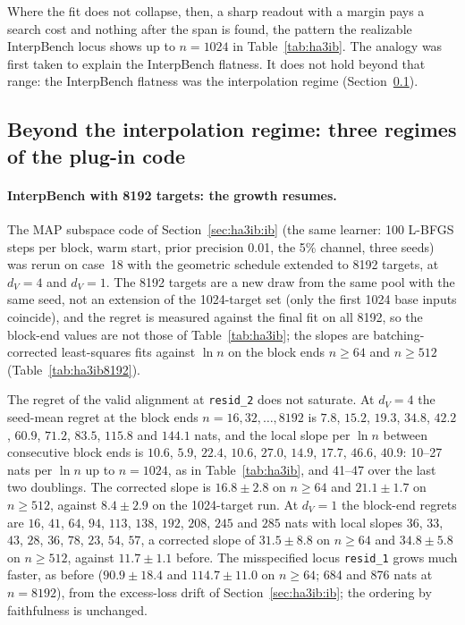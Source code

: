 \documentclass[11pt,a4paper]{article}
\newcommand{\dv}{d_V}
\begin{document}
Where the fit does not collapse, then, a sharp readout with a margin pays a search cost and nothing after the span is found, the pattern the realizable InterpBench locus shows up to $n=1024$ in Table~\ref{tab:ha3ib}. The analogy was first taken to explain the InterpBench flatness. It does not hold beyond that range: the InterpBench flatness was the interpolation regime (Section~\ref{sec:ha3concl}).

\subsection{Beyond the interpolation regime: three regimes of the plug-in code}
\label{sec:ha3concl}

\paragraph{InterpBench with 8192 targets: the growth resumes.} The MAP subspace code of Section~\ref{sec:ha3ib:ib} (the same learner: 100 L-BFGS steps per block, warm start, prior precision 0.01, the 5\% channel, three seeds) was rerun on case~18 with the geometric schedule extended to 8192 targets, at $\dv=4$ and $\dv=1$. The 8192 targets are a new draw from the same pool with the same seed, not an extension of the 1024-target set (only the first 1024 base inputs coincide), and the regret is measured against the final fit on all 8192, so the block-end values are not those of Table~\ref{tab:ha3ib}; the slopes are batching-corrected least-squares fits against $\ln n$ on the block ends $n\ge64$ and $n\ge512$ (Table~\ref{tab:ha3ib8192}).

The regret of the valid alignment at \texttt{resid\_2} does not saturate. At $\dv=4$ the seed-mean regret at the block ends $n=16,32,\dots,8192$ is $7.8$, $15.2$, $19.3$, $34.8$, $42.2$, $60.9$, $71.2$, $83.5$, $115.8$ and $144.1$ nats, and the local slope per $\ln n$ between consecutive block ends is $10.6$, $5.9$, $22.4$, $10.6$, $27.0$, $14.9$, $17.7$, $46.6$, $40.9$: 10--27 nats per $\ln n$ up to $n=1024$, as in Table~\ref{tab:ha3ib}, and 41--47 over the last two doublings. The corrected slope is $16.8\pm2.8$ on $n\ge64$ and $21.1\pm1.7$ on $n\ge512$, against $8.4\pm2.9$ on the 1024-target run. At $\dv=1$ the block-end regrets are $16$, $41$, $64$, $94$, $113$, $138$, $192$, $208$, $245$ and $285$ nats with local slopes $36$, $33$, $43$, $28$, $36$, $78$, $23$, $54$, $57$, a corrected slope of $31.5\pm8.8$ on $n\ge64$ and $34.8\pm5.8$ on $n\ge512$, against $11.7\pm1.1$ before. The misspecified locus \texttt{resid\_1} grows much faster, as before ($90.9\pm18.4$ and $114.7\pm11.0$ on $n\ge64$; 684 and 876 nats at $n=8192$), from the excess-loss drift of Section~\ref{sec:ha3ib:ib}; the ordering by faithfulness is unchanged.
\end{document}
